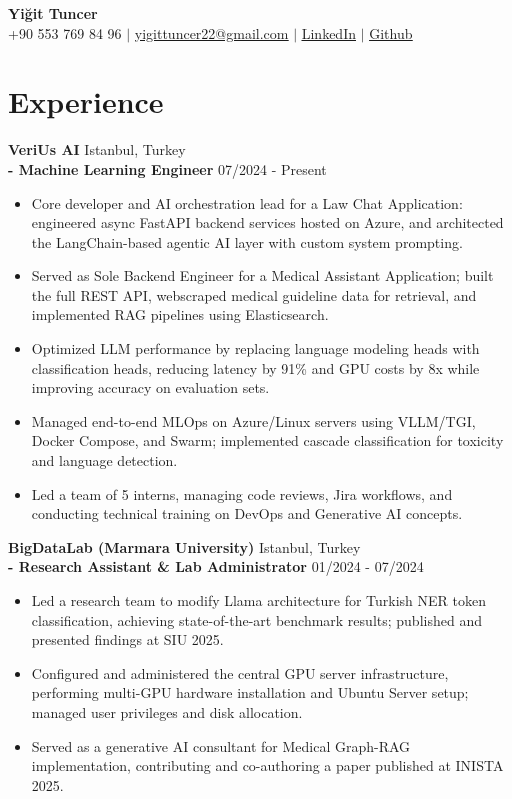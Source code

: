 \documentclass[paper=a4,fontsize=10pt]{scrartcl}
\begin{document}
\begin{center}
    \textbf{\Huge Yiğit Tuncer} \\ \vspace{2pt}
    +90 553 769 84 96 $|$ \href{mailto:yigittuncer22@gmail.com}{\underline{yigittuncer22@gmail.com}} $|$
    \href{https://www.linkedin.com/in/yigittuncer03/}{\underline{LinkedIn}} $|$
    \href{https://github.com/yigittuncer07}{\underline{Github}} 
\end{center}
\vspace{-10pt}

\section*{Experience}
\textbf{VeriUs AI} \hfill Istanbul, Turkey\\
\textbf{- Machine Learning Engineer} \hfill 07/2024 - Present
\begin{itemize}[noitemsep, topsep=2pt, parsep=0pt, partopsep=0pt, leftmargin=*]
    \item Core developer and AI orchestration lead for a Law Chat Application: engineered async FastAPI backend services hosted on Azure, and architected the LangChain-based agentic AI layer with custom system prompting.
    \item Served as Sole Backend Engineer for a Medical Assistant Application; built the full REST API, webscraped medical guideline data for retrieval, and implemented RAG pipelines using Elasticsearch.
    \item Optimized LLM performance by replacing language modeling heads with classification heads, reducing latency by 91\% and GPU costs by 8x while improving accuracy on evaluation sets.
    \item Managed end-to-end MLOps on Azure/Linux servers using VLLM/TGI, Docker Compose, and Swarm; implemented cascade classification for toxicity and language detection.
    \item Led a team of 5 interns, managing code reviews, Jira workflows, and conducting technical training on DevOps and Generative AI concepts.
\end{itemize}

\textbf{BigDataLab (Marmara University)} \hfill Istanbul, Turkey\\
\textbf{- Research Assistant \& Lab Administrator} \hfill 01/2024 - 07/2024
\begin{itemize}[noitemsep, topsep=2pt, parsep=0pt, partopsep=0pt, leftmargin=*]
    \item Led a research team to modify Llama architecture for Turkish NER token classification, achieving state-of-the-art benchmark results; published and presented findings at SIU 2025.
    \item Configured and administered the central GPU server infrastructure, performing multi-GPU hardware installation and Ubuntu Server setup; managed user privileges and disk allocation.
    \item Served as a generative AI consultant for Medical Graph-RAG implementation, contributing and co-authoring a paper published at INISTA 2025.
\end{itemize}
\end{document}
